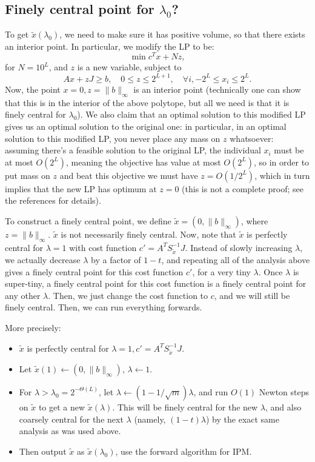 \documentclass[11pt]{article}
\begin{document}
\subsection{Finely central point for $\lambda_0$?}
To get $\tilde x(\lambda_0)$, we need to make sure it has positive volume, so that there exists an interior point. In particular, we modify the LP to be:
$$
\min c^Tx + Nz,
$$
for $N = 10^L$, and $z$ is a new variable, subject to
$$
Ax + z J \geq b, \quad 0 \leq z \leq 2^{L+1}, \quad \forall i, -2^L \leq x_i \leq 2^L.
$$
Now, the point $x = 0, z = \| b\|_\infty$ is an interior point (technically one can show that this is in the interior of the above polytope, but all we need is that it is finely central for $\lambda_0$). We also claim that an optimal solution to this modified LP gives us an optimal solution to the original one: in particular, in an optimal solution to this modified LP, you never place any mass on $z$ whatsoever: assuming there's a feasible solution to the original LP, the individual $x_i$ must be at most $O(2^L)$, meaning the objective has value at most $O(2^L)$, so in order to put mass on $z$ and beat this objective we must have $z = O(1/2^L)$, which in turn implies that the new LP has optimum at $z = 0$ (this is not a complete proof; see the references for details).

To construct a finely central point, we define $\tilde x = (0, \| b\|_\infty)$, where $z = \| b\|_\infty$. $\tilde x$ is not necessarily finely central. Now, note that $\tilde x$ is perfectly central for $\lambda = 1$ with cost function $c' = A^T S_{\tilde x}^{-1} J$. Instead of slowly increasing $\lambda$, we actually decrease $\lambda$ by a factor of $1-t$, and repeating all of the analysis above gives a finely central point for this cost function $c'$, for a very tiny $\lambda$. Once $\lambda$ is super-tiny, a finely central point for this cost function is a finely central point for any other $\lambda$. Then, we just change the cost function to $c$, and we will still be finely central. Then, we can run everything forwards.

More precisely:
\begin{itemize}
\item $\tilde x$ is perfectly central for $\lambda = 1, c' = A^T S_{\tilde x}^{-1} J$.
\item Let $\tilde x(1) \gets (0, \| b\|_\infty)$, $\lambda \gets 1$.
\item For $\lambda > \lambda_0 = 2^{-\Theta(L)}$, let $\lambda \gets(1-1/\sqrt m)\lambda$, and run $O(1)$ Newton steps on $\tilde x$ to get a new $\tilde x(\lambda)$. This will be finely central for the new $\lambda$, and also coarsely central for the next $\lambda$ (namely, $(1-t)\lambda$) by the exact same analysis as was used above.
\item Then output $\tilde x$ as $\tilde x(\lambda_0)$, use the forward algorithm for IPM.
\end{itemize}
\end{document}

